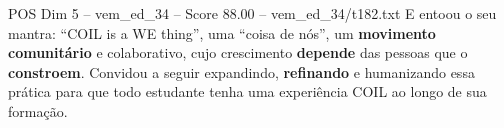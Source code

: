 \begin{textsample}{POS Dim 5 – vem\_ed\_34 – Score 88.00 – vem\_ed\_34/t182.txt}
E entoou o seu mantra: “COIL is a WE thing”, uma “coisa de nós”, um \textbf{movimento} \textbf{comunitário} e colaborativo, cujo crescimento \textbf{depende} das pessoas que o \textbf{constroem}.
Convidou a seguir expandindo, \textbf{refinando} e humanizando essa prática para que todo estudante tenha uma experiência COIL ao longo de sua formação.

\end{textsample}
